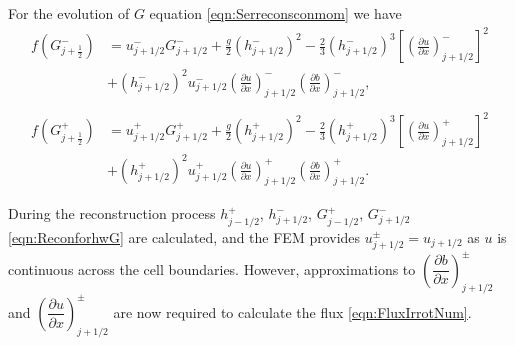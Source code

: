 For the evolution of $G$ equation \eqref{eqn:Serreconsconmom} we have 
\begin{subequations}
\begin{align}
f\left(G^-_{j+\frac{1}{2}}\right) &=  u^-_{j + 1/2} G^-_{j + 1/2}  + \frac{g}{2}\left(h^-_{j + 1/2} \right)^2 - \frac{2}{3}\left(h^-_{j + 1/2}\right)^3 \left[\left(\frac{\partial {u}}{\partial x} \right)^-_{j + 1/2} \right]^2 \nonumber\\ &+ \left(h^-_{j + 1/2}\right)^2 u^-_{j + 1/2} \left(\frac{\partial {u}}{\partial x} \right)^-_{j + 1/2} \left(\frac{\partial b}{\partial x} \right)^-_{j + 1/2}  ,\\ \nonumber \\
f\left(G^+_{j+\frac{1}{2}}\right) &= u^+_{j + 1/2} G^+_{j + 1/2}  + \frac{g}{2}\left(h^+_{j + 1/2} \right)^2 - \frac{2}{3}\left(h^+_{j + 1/2}\right)^3 \left[\left(\frac{\partial {u}}{\partial x} \right)^+_{j + 1/2} \right]^2 \nonumber\\ &+ \left(h^+_{j + 1/2}\right)^2 u^+_{j + 1/2} \left(\frac{\partial {u}}{\partial x} \right)^+_{j + 1/2} \left(\frac{\partial b}{\partial x} \right)^+_{j + 1/2}.
\end{align}
\label{eqn:FluxIrrotNum}
\end{subequations}

During the reconstruction process $h^+_{j - 1/2}$, $h^-_{j + 1/2}$, $G^+_{j - 1/2}$, $G^-_{j + 1/2}$ \eqref{eqn:ReconforhwG} are calculated, and the FEM provides $u^\pm_{j+1/2} = u_{j+1/2}$ as $u$ is continuous across the cell boundaries. However, approximations to $\left(\dfrac{\partial {b}}{\partial x} \right)^\pm_{j + 1/2}$ and $\left(\dfrac{\partial {u}}{\partial x} \right)^\pm_{j + 1/2}$ are now required to calculate the flux \eqref{eqn:FluxIrrotNum}. 

